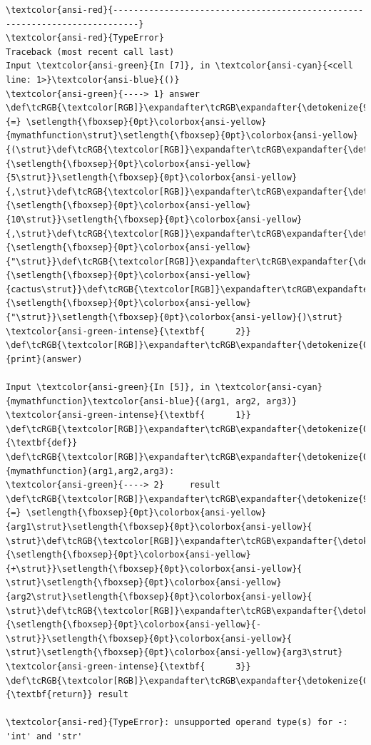     \begin{Verbatim}[commandchars=\\\{\}, frame=single, framerule=2mm, rulecolor=\color{outerrorbackground}]
\textcolor{ansi-red}{---------------------------------------------------------------------------}
\textcolor{ansi-red}{TypeError}                                 Traceback (most recent call last)
Input \textcolor{ansi-green}{In [7]}, in \textcolor{ansi-cyan}{<cell line: 1>}\textcolor{ansi-blue}{()}
\textcolor{ansi-green}{----> 1} answer \def\tcRGB{\textcolor[RGB]}\expandafter\tcRGB\expandafter{\detokenize{98,98,98}}{=} \setlength{\fboxsep}{0pt}\colorbox{ansi-yellow}{mymathfunction\strut}\setlength{\fboxsep}{0pt}\colorbox{ansi-yellow}{(\strut}\def\tcRGB{\textcolor[RGB]}\expandafter\tcRGB\expandafter{\detokenize{98,98,98}}{\setlength{\fboxsep}{0pt}\colorbox{ansi-yellow}{5\strut}}\setlength{\fboxsep}{0pt}\colorbox{ansi-yellow}{,\strut}\def\tcRGB{\textcolor[RGB]}\expandafter\tcRGB\expandafter{\detokenize{98,98,98}}{\setlength{\fboxsep}{0pt}\colorbox{ansi-yellow}{10\strut}}\setlength{\fboxsep}{0pt}\colorbox{ansi-yellow}{,\strut}\def\tcRGB{\textcolor[RGB]}\expandafter\tcRGB\expandafter{\detokenize{175,0,0}}{\setlength{\fboxsep}{0pt}\colorbox{ansi-yellow}{"\strut}}\def\tcRGB{\textcolor[RGB]}\expandafter\tcRGB\expandafter{\detokenize{175,0,0}}{\setlength{\fboxsep}{0pt}\colorbox{ansi-yellow}{cactus\strut}}\def\tcRGB{\textcolor[RGB]}\expandafter\tcRGB\expandafter{\detokenize{175,0,0}}{\setlength{\fboxsep}{0pt}\colorbox{ansi-yellow}{"\strut}}\setlength{\fboxsep}{0pt}\colorbox{ansi-yellow}{)\strut}
\textcolor{ansi-green-intense}{\textbf{      2}} \def\tcRGB{\textcolor[RGB]}\expandafter\tcRGB\expandafter{\detokenize{0,135,0}}{print}(answer)

Input \textcolor{ansi-green}{In [5]}, in \textcolor{ansi-cyan}{mymathfunction}\textcolor{ansi-blue}{(arg1, arg2, arg3)}
\textcolor{ansi-green-intense}{\textbf{      1}} \def\tcRGB{\textcolor[RGB]}\expandafter\tcRGB\expandafter{\detokenize{0,135,0}}{\textbf{def}} \def\tcRGB{\textcolor[RGB]}\expandafter\tcRGB\expandafter{\detokenize{0,0,255}}{mymathfunction}(arg1,arg2,arg3):
\textcolor{ansi-green}{----> 2}     result \def\tcRGB{\textcolor[RGB]}\expandafter\tcRGB\expandafter{\detokenize{98,98,98}}{=} \setlength{\fboxsep}{0pt}\colorbox{ansi-yellow}{arg1\strut}\setlength{\fboxsep}{0pt}\colorbox{ansi-yellow}{ \strut}\def\tcRGB{\textcolor[RGB]}\expandafter\tcRGB\expandafter{\detokenize{98,98,98}}{\setlength{\fboxsep}{0pt}\colorbox{ansi-yellow}{+\strut}}\setlength{\fboxsep}{0pt}\colorbox{ansi-yellow}{ \strut}\setlength{\fboxsep}{0pt}\colorbox{ansi-yellow}{arg2\strut}\setlength{\fboxsep}{0pt}\colorbox{ansi-yellow}{ \strut}\def\tcRGB{\textcolor[RGB]}\expandafter\tcRGB\expandafter{\detokenize{98,98,98}}{\setlength{\fboxsep}{0pt}\colorbox{ansi-yellow}{-\strut}}\setlength{\fboxsep}{0pt}\colorbox{ansi-yellow}{ \strut}\setlength{\fboxsep}{0pt}\colorbox{ansi-yellow}{arg3\strut}
\textcolor{ansi-green-intense}{\textbf{      3}}     \def\tcRGB{\textcolor[RGB]}\expandafter\tcRGB\expandafter{\detokenize{0,135,0}}{\textbf{return}} result

\textcolor{ansi-red}{TypeError}: unsupported operand type(s) for -: 'int' and 'str'
    \end{Verbatim}

